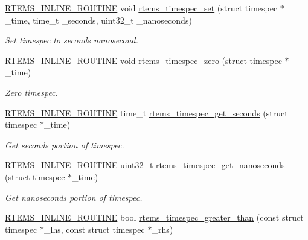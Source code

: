 \begin{DoxyCompactItemize}
\mbox{\hyperlink{group__RTEMSScoreBaseDefs_gac216239df231d5dbd15e3520b0b9313f}{R\+T\+E\+M\+S\+\_\+\+I\+N\+L\+I\+N\+E\+\_\+\+R\+O\+U\+T\+I\+NE}} void \mbox{\hyperlink{group__TimespecAPI_ga3f13544a71b06b58814f719472b3e453}{rtems\+\_\+timespec\+\_\+set}} (struct timespec $\ast$\+\_\+time, time\+\_\+t \+\_\+seconds, uint32\+\_\+t \+\_\+nanoseconds)
\begin{DoxyCompactList}\small\item\em Set timespec to seconds nanosecond. \end{DoxyCompactList}\item 
\mbox{\hyperlink{group__RTEMSScoreBaseDefs_gac216239df231d5dbd15e3520b0b9313f}{R\+T\+E\+M\+S\+\_\+\+I\+N\+L\+I\+N\+E\+\_\+\+R\+O\+U\+T\+I\+NE}} void \mbox{\hyperlink{group__TimespecAPI_gae32732bb9825bc951cb13bf146589e15}{rtems\+\_\+timespec\+\_\+zero}} (struct timespec $\ast$\+\_\+time)
\begin{DoxyCompactList}\small\item\em Zero timespec. \end{DoxyCompactList}\item 
\mbox{\hyperlink{group__RTEMSScoreBaseDefs_gac216239df231d5dbd15e3520b0b9313f}{R\+T\+E\+M\+S\+\_\+\+I\+N\+L\+I\+N\+E\+\_\+\+R\+O\+U\+T\+I\+NE}} time\+\_\+t \mbox{\hyperlink{group__TimespecAPI_ga6f1ac4a1319b9e04ad6a054d5a31a6cb}{rtems\+\_\+timespec\+\_\+get\+\_\+seconds}} (struct timespec $\ast$\+\_\+time)
\begin{DoxyCompactList}\small\item\em Get seconds portion of timespec. \end{DoxyCompactList}\item 
\mbox{\hyperlink{group__RTEMSScoreBaseDefs_gac216239df231d5dbd15e3520b0b9313f}{R\+T\+E\+M\+S\+\_\+\+I\+N\+L\+I\+N\+E\+\_\+\+R\+O\+U\+T\+I\+NE}} uint32\+\_\+t \mbox{\hyperlink{group__TimespecAPI_gafc36c8265bc41ac98d2f3531c7e6fc7d}{rtems\+\_\+timespec\+\_\+get\+\_\+nanoseconds}} (struct timespec $\ast$\+\_\+time)
\begin{DoxyCompactList}\small\item\em Get nanoseconds portion of timespec. \end{DoxyCompactList}\item 
\mbox{\hyperlink{group__RTEMSScoreBaseDefs_gac216239df231d5dbd15e3520b0b9313f}{R\+T\+E\+M\+S\+\_\+\+I\+N\+L\+I\+N\+E\+\_\+\+R\+O\+U\+T\+I\+NE}} bool \mbox{\hyperlink{group__TimespecAPI_ga66ce6ca5ea758f01dd845f86c509dc80}{rtems\+\_\+timespec\+\_\+greater\+\_\+than}} (const struct timespec $\ast$\+\_\+lhs, const struct timespec $\ast$\+\_\+rhs)

\end{DoxyCompactItemize}
